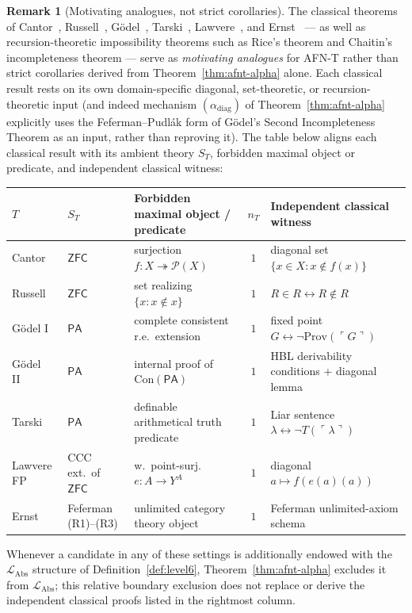 \documentclass[11pt]{article}
\theoremstyle{plain}
\theoremstyle{definition}
\newtheorem{remark}[theorem]{Remark}
\newcommand{\cP}{\mathcal{P}}
\newcommand{\LAbs}{\mathcal{L}_{\mathrm{Abs}}}
\newcommand{\Con}{\mathrm{Con}}
\newcommand{\ZFC}{\mathsf{ZFC}}
\begin{document}
\begin{remark}[Motivating analogues, not strict corollaries]\label{thm:subsumption}
The classical theorems of Cantor~\cite{Cantor1891}, Russell~\cite{Russell1903}, G\"odel~\cite{Godel1931}, Tarski~\cite{Tarski1936}, Lawvere~\cite{Lawvere1969}, and Ernst~\cite{Ernst2015} --- as well as recursion-theoretic impossibility theorems such as Rice's theorem and Chaitin's incompleteness theorem --- serve as \emph{motivating analogues} for AFN-T rather than strict corollaries derived from Theorem~\ref{thm:afnt-alpha} alone. Each classical result rests on its own domain-specific diagonal, set-theoretic, or recursion-theoretic input (and indeed mechanism $(\alpha_{\mathrm{diag}})$ of Theorem~\ref{thm:afnt-alpha} explicitly uses the Feferman--Pudl\'ak form of G\"odel's Second Incompleteness Theorem as an input, rather than reproving it). The table below aligns each classical result with its ambient theory $S_T$, forbidden maximal object or predicate, and independent classical witness:
\begin{center}\footnotesize
\begin{tabular}{@{}p{2.0cm} p{2.2cm} p{4.1cm} c p{4.7cm}@{}}
\toprule
$T$ & $S_T$ & Forbidden maximal object / predicate & $n_T$ & Independent classical witness \\ \midrule
Cantor~\cite{Cantor1891} & $\ZFC$ & surjection $f : X \twoheadrightarrow \cP(X)$ & $1$ & diagonal set $\{x \in X : x \notin f(x)\}$ \\
Russell~\cite{Russell1903} & $\ZFC$ & set realizing $\{x : x \notin x\}$ & $1$ & $R \in R \leftrightarrow R \notin R$ \\
G\"odel I~\cite{Godel1931} & $\mathsf{PA}$ & complete consistent r.e.\ extension & $1$ & fixed point $G \leftrightarrow \neg \mathrm{Prov}(\ulcorner G \urcorner)$ \\
G\"odel II~\cite{Godel1931} & $\mathsf{PA}$ & internal proof of $\Con(\mathsf{PA})$ & $1$ & HBL derivability conditions + diagonal lemma \\
Tarski~\cite{Tarski1936} & $\mathsf{PA}$ & definable arithmetical truth predicate & $1$ & Liar sentence $\lambda \leftrightarrow \neg T(\ulcorner \lambda \urcorner)$ \\
Lawvere FP~\cite{Lawvere1969} & CCC ext.\ of $\ZFC$ & w.\ point-surj.\ $e : A \to Y^A$ & $1$ & diagonal $a \mapsto f(e(a)(a))$ \\
Ernst~\cite{Ernst2015} & Feferman (R1)--(R3) & unlimited category theory object & $1$ & Feferman unlimited-axiom schema \\
\bottomrule
\end{tabular}
\end{center}
Whenever a candidate in any of these settings is additionally endowed with the $\LAbs$ structure of Definition~\ref{def:level6}, Theorem~\ref{thm:afnt-alpha} excludes it from $\LAbs$; this relative boundary exclusion does not replace or derive the independent classical proofs listed in the rightmost column.
\end{remark}
\end{document}
